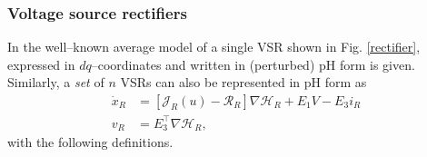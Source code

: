 \documentclass[5p,twocolumn]{elsarticle}
\numberwithin{equation}{section}
\begin{document}
\subsubsection{Voltage source rectifiers}
In \cite{ESCVANORT,HERetal,ECCZonetti} the well--known average model of a single VSR shown in Fig. \ref{rectifier}, expressed in $dq$--coordinates and written in (perturbed) pH form is given. Similarly, a {\em set} of $n$ VSRs can also be represented in pH form as
\begin{equation}
\label{rectifierPH}
\begin{aligned}
\dot x_{R}&=[\mathcal{J}_{R}(u)-\mathcal{R}_{R}]\nabla\mathcal H_{R}+E_1V-E_3i_{R}\\
v_{R}&=E_3^\top \nabla\mathcal H_{R},
\end{aligned}
\end{equation}
with the following definitions.
\end{document}
